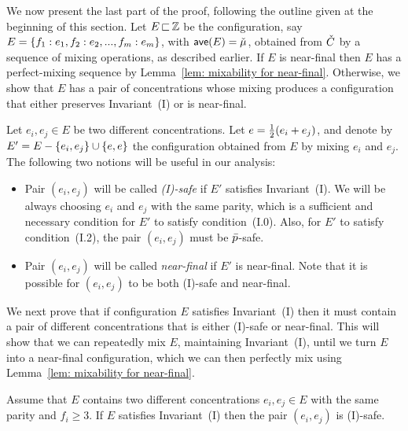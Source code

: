 
We now present the last part of the proof, following the outline given at the beginning
of this section. Let $E{\,\sqsubset\,}{\mathbb Z}$ be the configuration, say
$E = { \left\{ f_1:e_1, f_2:e_2, ... , f_m:e_m \right\} }$, with ${\textsf{ave}}(E)={\check{\mu}}$,
obtained from ${\check{C}}$ by a sequence of mixing operations, as described earlier.
If $E$ is near-final then $E$ has a perfect-mixing sequence 
by Lemma~\ref{lem: mixability for near-final}.
Otherwise, we show that $E$ has a pair of concentrations 
whose mixing produces a configuration that either preserves Invariant~(I) or is near-final.

Let $e_i,e_j\in E$ be two different concentrations. Let $e = {\textstyle\frac{1}{2}}(e_i+e_j)$, and denote by
$E' = E- { \left\{ e_i,e_j \right\} }\cup { \left\{ e,e \right\} }$ the configuration obtained from $E$ by mixing $e_i$ and $e_j$.
The following two notions will be useful in our analysis:
%
\begin{itemize}
	\item  Pair $(e_i,e_j)$ will be called \emph{(I)-safe} if $E'$ satisfies Invariant~(I).
	We will be always choosing $e_i$ and $e_j$ with the same parity, which is a sufficient
	and necessary condition for $E'$ to satisfy condition~(I.0). Also,
	for $E'$ to satisfy condition~(I.2), the pair $(e_i,e_j)$ must be ${\bar{p}}$-safe.
	\item Pair $(e_i,e_j)$ will be called \emph{near-final} if $E'$ is near-final.
	Note that it is possible for $(e_i,e_j)$ to be both (I)-safe and near-final.
\end{itemize}
%
We next prove that if configuration $E$ satisfies Invariant~(I) 
then it must contain a pair of different concentrations that is either (I)-safe
or near-final. This will show that we can repeatedly mix $E$, 
maintaining Invariant~(I), until we turn $E$ into a near-final configuration,
which we can then perfectly mix using Lemma~\ref{lem: mixability for near-final}.

\begin{lemma}%
	\label{lem: invariant, two same parity, fi >= 3}
	Assume that $E$ contains two different concentrations $e_i,e_j\in E$
	with the same parity and $f_i\ge 3$.
	If $E$ satisfies Invariant~(I) then the pair $(e_i,e_j)$ is (I)-safe.
\end{lemma}%

